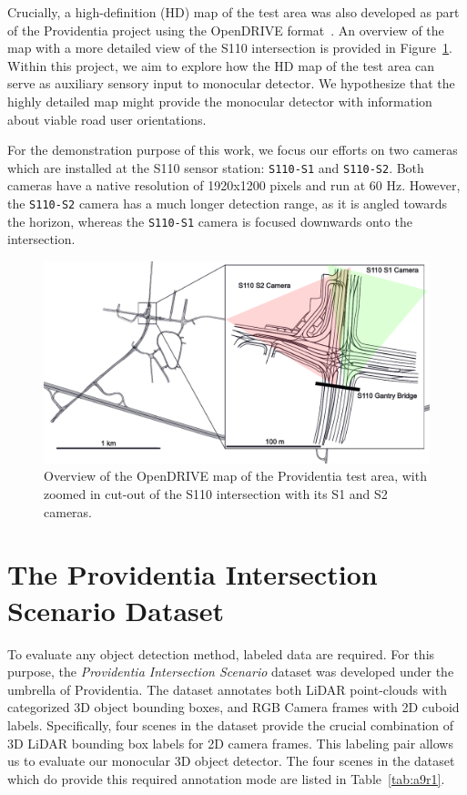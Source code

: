 Crucially, a high-definition (HD) map of the test area was also developed as part of the Providentia project using the OpenDRIVE format~\cite{dupuis2010opendrive}.
An overview of the map with a more detailed view of the S110 intersection is provided in Figure~\ref{fig:providentia-opendrive-map}.
Within this project, we aim to explore how the HD map of the test area can serve as  auxiliary sensory input to monocular detector.
We hypothesize that the highly detailed map might provide the monocular detector with information about viable road user orientations.

For the demonstration purpose of this work, we focus our efforts on two cameras which are installed at the S110 sensor station: \texttt{S110-S1} and \texttt{S110-S2}.
Both cameras have a native resolution of 1920x1200 pixels and run at 60 Hz.
However, the \texttt{S110-S2} camera has a much longer detection range, as it is angled towards the horizon, whereas the \texttt{S110-S1} camera is focused downwards onto the intersection.

\begin{figure}[htb]
    \includegraphics[width=\linewidth]{figures/map}
    \caption{Overview of the OpenDRIVE map of the Providentia test area, with zoomed in cut-out of the S110 intersection with its S1 and S2 cameras.}
    \label{fig:providentia-opendrive-map}
\end{figure}


\section{The Providentia Intersection Scenario Dataset}
\label{sec:a9dataset}

To evaluate any object detection method, labeled data are required.
For this purpose, the \textit{Providentia Intersection Scenario} dataset was developed under the umbrella of Providentia.
The dataset annotates both LiDAR point-clouds with categorized 3D object bounding boxes, and RGB Camera frames with 2D cuboid labels.
Specifically, four scenes in the dataset provide the crucial combination of 3D LiDAR bounding box labels for 2D camera frames.
This labeling pair allows us to evaluate our monocular 3D object detector.
The four scenes in the dataset which do provide this required annotation mode are listed in Table~\ref{tab:a9r1}.

